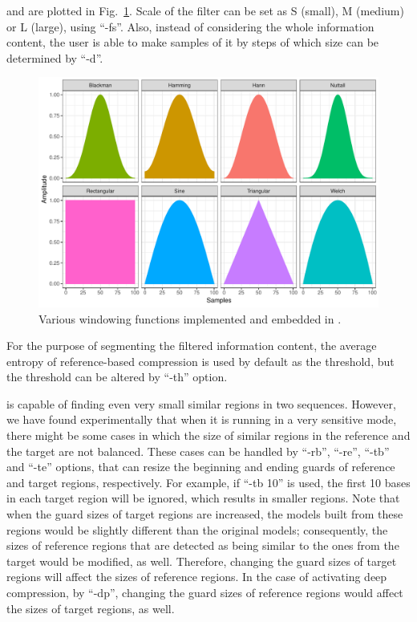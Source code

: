 and are plotted in Fig.~\ref{fig.filters}.
Scale of the filter can be set as S (small), M (medium) or L (large), using ``-fs''.
Also, instead of considering the whole information content, the user is able to make samples of it by steps of which size can be determined by ``-d''.
\begin{figure}[!h]
  \centering
  \includegraphics[width=\linewidth]{filters.pdf}
  \caption{Various windowing functions implemented and embedded in \smashpp.}
  \label{fig.filters}
\end{figure}

For the purpose of segmenting the filtered information content, the average entropy of reference-based compression is used by default as the threshold, but the threshold can be altered by ``-th'' option.

\smashpp is capable of finding even very small similar regions in two sequences. However, we have found experimentally that when it is running in a very sensitive mode, there might be some cases in which the size of similar regions in the reference and the target are not balanced. These cases can be handled by ``-rb'', ``-re'', ``-tb'' and ``-te'' options, that can resize the beginning and ending guards of reference and target regions, respectively.
For example, if ``-tb 10'' is used, the first 10 bases in each target region will be ignored, which results in smaller regions.
Note that when the guard sizes of target regions are increased, the models built from these regions would be slightly different than the original models; consequently, the sizes of reference regions that are detected as being similar to the ones from the target would be modified, as well. Therefore, changing the guard sizes of target regions will affect the sizes of reference regions. 
In the case of activating deep compression, by ``-dp'', changing the guard sizes of reference regions would affect the sizes of target regions, as well.

